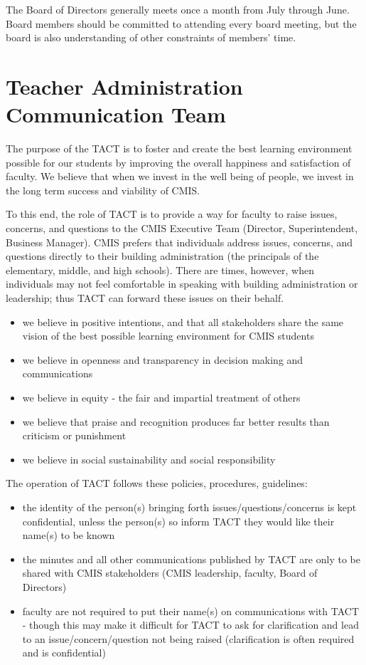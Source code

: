 \documentclass{report}
\begin{document}
The Board of Directors generally meets once a month from July through June.  Board members should be committed to attending every board meeting, but the board is also understanding of other constraints of members’ time.

\section{Teacher Administration Communication Team}

The purpose of the TACT is to foster and create the best learning environment possible for our students by improving the overall happiness and satisfaction of faculty. We believe that when we invest in the well being of people, we invest in the long term success and viability of CMIS.

To this end, the role of TACT is to provide a way for faculty to raise issues, concerns, and questions to the CMIS Executive Team (Director, Superintendent, Business Manager).  CMIS prefers that individuals address issues, concerns, and questions directly to their building administration (the principals of the elementary, middle, and high schools).  There are times, however, when individuals may not feel comfortable in speaking with building administration or leadership; thus TACT can forward these issues on their behalf.
\begin{itemize}
\item we believe in positive intentions, and that all stakeholders share the same vision of the best possible learning environment for CMIS students
\item we believe in openness and transparency in decision making and communications
\item we believe in equity - the fair and impartial treatment of others
\item we believe that praise and recognition produces far better results than criticism or punishment
\item we believe in social sustainability and social responsibility
\end{itemize}

The operation of TACT follows these policies, procedures, guidelines:

\begin{itemize}
\item the identity of the person(s) bringing forth issues/questions/concerns is kept confidential, unless the person(s) so inform TACT they would like their name(s) to be known
\item the minutes and all other communications published by TACT are only to be shared with CMIS stakeholders (CMIS leadership, faculty, Board of Directors)
\item faculty are not required to put their name(s) on communications with TACT - though this may make it difficult for TACT to ask for clarification and lead to an issue/concern/question not being raised (clarification is often required and is confidential)
\end{itemize}
\end{document}
